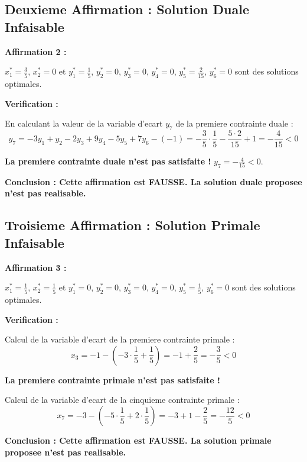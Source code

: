 \documentclass[12pt,a4paper]{article}
\begin{document}
\subsection{Deuxieme Affirmation : Solution Duale Infaisable}

\begin{exemple}
\textbf{Affirmation 2 :}

$x_1^* = \frac{3}{5}$, $x_2^* = 0$ et $y_1^* = \frac{1}{5}$, $y_2^* = 0$, $y_3^* = 0$, $y_4^* = 0$, $y_5^* = \frac{2}{15}$, $y_6^* = 0$ sont des solutions optimales.

\textbf{Verification :}

En calculant la valeur de la variable d'ecart $y_7$ de la premiere contrainte duale :
$$y_7 = -3y_1 + y_2 - 2y_3 + 9y_4 - 5y_5 + 7y_6 - (-1) = -\frac{3}{5} \cdot \frac{1}{5} - \frac{5 \cdot 2}{15} + 1 = -\frac{4}{15} < 0$$

\textcolor{importantrouge}{\textbf{La premiere contrainte duale n'est pas satisfaite !}} $y_7 = -\frac{4}{15} < 0$.

\textcolor{importantrouge}{\textbf{Conclusion : Cette affirmation est FAUSSE. La solution duale proposee n'est pas realisable.}}
\end{exemple}

\subsection{Troisieme Affirmation : Solution Primale Infaisable}

\begin{exemple}
\textbf{Affirmation 3 :}

$x_1^* = \frac{1}{5}$, $x_2^* = \frac{1}{5}$ et $y_1^* = 0$, $y_2^* = 0$, $y_3^* = 0$, $y_4^* = 0$, $y_5^* = \frac{1}{5}$, $y_6^* = 0$ sont des solutions optimales.

\textbf{Verification :}

Calcul de la variable d'ecart de la premiere contrainte primale :
$$x_3 = -1 - (-3 \cdot \frac{1}{5} + \frac{1}{5}) = -1 + \frac{2}{5} = -\frac{3}{5} < 0$$

\textcolor{importantrouge}{\textbf{La premiere contrainte primale n'est pas satisfaite !}}

Calcul de la variable d'ecart de la cinquieme contrainte primale :
$$x_7 = -3 - (-5 \cdot \frac{1}{5} + 2 \cdot \frac{1}{5}) = -3 + 1 - \frac{2}{5} = -\frac{12}{5} < 0$$

\textcolor{importantrouge}{\textbf{Conclusion : Cette affirmation est FAUSSE. La solution primale proposee n'est pas realisable.}}
\end{exemple}
\end{document}
